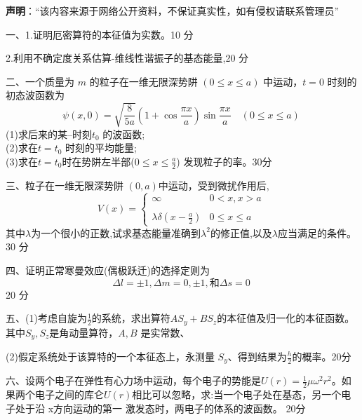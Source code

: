 
\textbf{声明}：“该内容来源于网络公开资料，不保证真实性，如有侵权请联系管理员”

一、1.证明厄密算符的本征值为实数。10 分

2.利用不确定度关系估算-维线性谐振子的基态能量,20 分

二、一个质量为 $m$ 的粒子在一维无限深势阱 $ (0 \leq x \leq a) $ 中运动，$t = 0$ 时刻的初态波函数为
$$\psi(x, 0) = \sqrt{\frac{8}{5a}} (1 + \cos \frac{\pi x}{a}) \sin \frac{\pi x}{a} \quad (0 \leq x \leq a)~$$ 
(1)求后来的某--时刻$t_0$ 的波函数;\\
(2)求在$t=t_0$ 时刻的平均能量;\\
(3)求在$t=t_0$时在势阱左半部($0\leq  x \leq \frac{a}{2}$) 发现粒子的率。30分

三、粒子在一维无限深势阱 $(0,a)$中运动，受到微扰作用后,
$$V(x) = \begin{cases} \infty & 0 < x, x > a \\\\ \lambda \delta \left( x - \frac{a}{2} \right) & 0 \leq x \leq a \end{cases}~$$
其中$\lambda$为一个很小的正数,试求基态能量准确到$\lambda^2$的修正值,以及$\lambda$应当满足的条件。30 分

四、证明正常寒曼效应(偶极跃迁)的选择定则为
$$\Delta l = \pm 1, \Delta m = 0, \pm 1,\text{和} \Delta s = 0~$$
20 分

五、(1)考虑自旋为$\frac{1}{2}$的系统，求出算符$AS_{y}+BS_{z}$的本征值及归一化的本征函数。其中$S_y,S_z$是角动量算符，$A,B$ 是实常数、

(2)假定系统处于该算特的一个本征态上，永测量 $S_y$、得到结果为$\frac{h}{2}$的概率。20分

六、设两个电子在弹性有心力场中运动，每个电子的势能是$U(r) = \frac{1}{2}\mu \omega^2 r^2$。如果两个电子之间的库仑$U(r)$相比可以忽略，求:当一个电子处在基态，另一个电子处于沿 x方向运动的第一 激发态时，两电子的体系的波函数。
20分